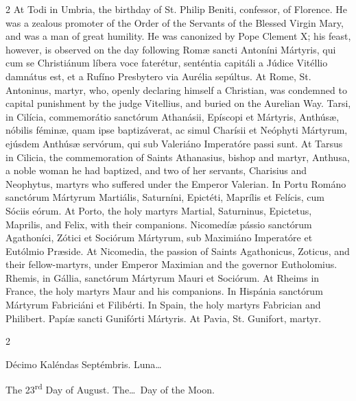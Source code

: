 \begin{paracol}{2}
\switchcolumn
{}
At Todi in Umbria, the birthday of 
 St. Philip Beniti, confessor, of Florence. He was a zealous promoter 
 of the Order of the Servants of the Blessed Virgin Mary, and was a man of 
 great humility. He was canonized by Pope Clement X; his feast, 
 however, is observed on the day following
\switchcolumn*
{}
Romæ sancti Antoníni 
 Mártyris, qui cum se Christiánum líbera voce faterétur, senténtia capitáli a 
 Júdice Vitéllio damnátus est, et a Rufíno Presbytero via Aurélia sepúltus.
\switchcolumn
{}
At Rome, St. Antoninus, martyr, who, 
 openly declaring himself a Christian, was condemned to capital punishment by 
 the judge Vitellius, and buried on the Aurelian Way.
\switchcolumn*
{}
Tarsi, in Cilícia, commemorátio sanctórum Athanásii, Epíscopi et Mártyris, Anthúsæ, nóbilis 
 féminæ, quam ipse baptizáverat, ac simul Charísii et Neóphyti Mártyrum, 
 ejúsdem Anthúsæ servórum, qui sub Valeriáno Imperatóre passi sunt.
\switchcolumn
{}
At Tarsus in Cilicia, the 
 commemoration of Saints Athanasius, bishop and martyr, Anthusa, a noble 
 woman he had baptized, and two of her servants, Charisius and Neophytus, 
 martyrs who suffered under the Emperor Valerian.
\switchcolumn*
{}
In Portu Románo sanctórum Mártyrum Martiális, Saturníni, Epictéti, Maprílis et Felícis, cum 
 Sóciis eórum.
\switchcolumn
{}
At Porto, the holy martyrs Martial, 
 Saturninus, Epictetus, Maprilis, and Felix, with their companions.
\switchcolumn*
{}
Nicomedíæ pássio 
 sanctórum Agathoníci, Zótici et Sociórum Mártyrum, sub Maximiáno Imperatóre 
 et Eutólmio Præside.
\switchcolumn
{}
At Nicomedia, the passion of Saints 
 Agathonicus, Zoticus, and their fellow-martyrs, under Emperor Maximian and 
 the governor Eutholomius.
\switchcolumn*
{}
Rhemis, in Gállia, 
 sanctórum Mártyrum Mauri et Sociórum.
\switchcolumn
{}
At Rheims in France, the holy 
 martyrs Maur and his companions.
\switchcolumn*
{}
In Hispánia sanctórum 
 Mártyrum Fabriciáni et Filibérti.
\switchcolumn
{}
In Spain, the holy martyrs Fabrician 
 and Philibert.
\switchcolumn*
{}
Papíæ sancti Gunifórti 
 Mártyris.
\switchcolumn
{}
At Pavia, St. Gunifort, martyr.
\switchcolumn*
{}
\end{paracol}


\begin{paracol}{2}
\begin{center}{\color{gregoriocolor} Décimo Kaléndas Septémbris. 
 Luna\dots\ }\end{center}
\switchcolumn
{}
\begin{center}{\color{gregoriocolor} The 
 23\textsuperscript{rd} Day of 
 August. The\dots\ Day of the Moon.}\end{center}
\end{paracol}

